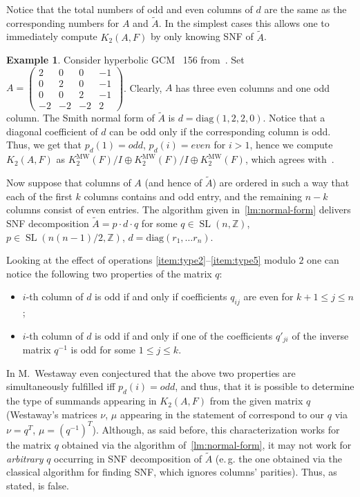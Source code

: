 \documentclass[oneside, 10pt]{amsart}
\theoremstyle{plain}
\theoremstyle{remark}
\theoremstyle{definition}
\newtheorem{example}{Example} \Crefname{example}{Example}{Examples}
\DeclareMathOperator{\SL}{SL}
\newcommand{\ZZ}{\mathbb{Z}}
\newcommand{\K}{K_2}
\newcommand{\Kmw}{K^{\mathrm{MW}}_2}
\begin{document}
Notice that the total numbers of odd and even columns of $d$ are the same as the corresponding numbers for $A$ and $\widetilde{A}$.
In the simplest cases this allows one to immediately compute $\K(A, F)$ by only knowing SNF of $\widetilde{A}$.
\begin{example}
Consider hyperbolic GCM \textnumero~156 from~\cite[p.~19]{MW}.
 Set $A = \left(\begin{smallmatrix}
 2& 0& 0& -1\\
 0& 2& 0& -1\\
 0& 0& 2& -1\\
 -2& -2& -2& 2\end{smallmatrix}\right)$.
Clearly, $A$ has three even columns and one odd column. 
The Smith normal form of $\widetilde{A}$ is $d=\mathrm{diag}(1,2,2,0)$.
Notice that a diagonal coefficient of $d$ can be odd only if the corresponding column is odd.
Thus, we get that $p_d(1)=odd$, $p_d(i)=even$ for $i>1$, hence we compute $\K(A, F)$ as $\Kmw(F)/I \oplus \Kmw(F)/I \oplus \Kmw(F)$,
 which agrees with~\cite{MW}.
\end{example}
  
Now suppose that columns of $A$ (and hence of $\widetilde{A}$) are ordered in such a way that
 each of the first $k$ columns contains and odd entry, and the remaining $n-k$ columns consist of even entries.
The algorithm given in~\cref{lm:normal-form} delivers SNF decomposition
 $\widetilde{A} = p \cdot d \cdot q $ for some $q \in \SL(n, \ZZ)$, $p \in \SL(n(n-1)/2, \ZZ)$, $d = \mathrm{diag}(r_1, \ldots r_n)$.

Looking at the effect of operations \eqref{item:type2}--\eqref{item:type5} modulo $2$ one can notice the following two properties of the matrix $q$:
\begin{itemize}
 \item $i$-th column of $d$ is odd if and only if coefficients $q_{ij}$ are even for $k+1\leq j \leq n$;
 \item $i$-th column of $d$ is odd if and only if one of the coefficients $q'_{ji}$ of the inverse matrix $q^{-1}$ is odd for some $1\leq j\leq k$.
\end{itemize}

In \cite{MW} M.~Westaway even conjectured that the above two properties are simultaneously fulfilled iff $p_d(i)=odd$, and thus, that
 it is possible to determine the type of summands appearing in $\K(A, F)$ from the given matrix $q$
 (Westaway's matrices $\nu$, $\mu$ appearing in the statement of \cite[Conjecture~9.1]{MW} correspond to our $q$ via $\nu = q^T$, $\mu = (q^{-1})^T$).
Although, as said before, this characterization works for the matrix $q$ obtained via the algorithm of~\cref{lm:normal-form},
 it may not work for {\it arbitrary} $q$ occurring in SNF decomposition of $\widetilde{A}$
 (e.\,g. the one obtained via the classical algorithm for finding SNF, which ignores columns' parities).
Thus, as stated, \cite[Conjecture~9.1]{MW} is false.
\end{document}
